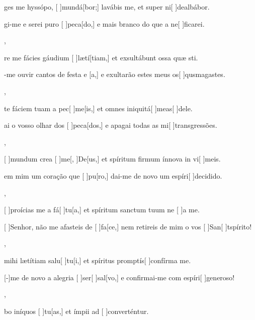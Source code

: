 {  {\item {}ges me hyssópo, [ ]{mun}{dá}[bor;] lavábis me, et super ni[ ]{de}{al}{bá}bor.~\Antiphona}%
    {\item {}gi-me e serei puro [ ]{pe}{ca}[do,] e mais branco do que a ne[ ]{fi}{ca}{rei}.~\Antiphona},
  {\item {}re me fácies gáudium [ ]{læ}{tí}[tiam,] et exsultábunt ossa quæ sti.~\Antiphona}%
    {\item {}-me ouvir cantos de festa e [a,] e exultarão estes meus os[ ]{qus}{ma}{gas}tes.~\Antiphona},
  {\item {}te fáciem tuam a pec[ ]{me}[is,] et omnes iniquitá[ ]{me}{as}[ ]{de}le.~\Antiphona}%
    {\item {}ai o vosso olhar dos [ ]{pe}{ca}[dos,] e apagai todas as mi[ ]{trans}{gres}{sões}.~\Antiphona},
  {\item {}[ ]{mun}dum crea [ ]{me}[, ]{De}[us,] et spíritum firmum ínnova in vi[ ]{me}is.~\Antiphona}%
    {\item {} em mim um coração que [ ]{pu}[ro,] dai-me de novo um espíri[ ]{de}{ci}{di}do.~\Antiphona},
  {\item {}[ ]{pro}ícias me a fá[ ]{tu}[a,] et spíritum sanctum tuum ne [ ]{a} me.~\Antiphona}%
    {\item {}[ ]{Se}nhor, não me afasteis de [ ]{fa}[ce,] nem retireis de mim o vos [ ]{San}[ ]{ts}{píri}to!~\Antiphona},
  {\item {} mihi lætítiam salu[ ]{tu}[i,] et spíritus promptís[ ]{con}{fírma} me.~\Antiphona}%
    {\item {}[-]{me} de novo a alegria [ ]{ser}[ ]{sal}[vo,] e confir\-mai-me com espíri[ ]{ge}{ne}{ro}so!~\Antiphona},
  {\item {}bo iníquos [ ]{tu}[as,] et ímpii ad [ ]{con}{ver}{tén}{\-tur.}~\Antiphona}%
}
